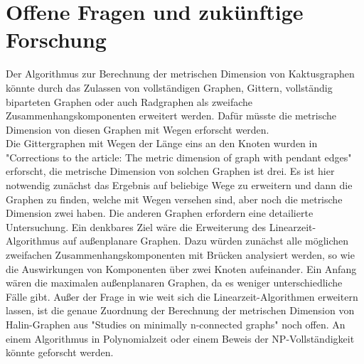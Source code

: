 \section{Offene Fragen und zukünftige Forschung}
\vspace{-2mm}
Der Algorithmus zur Berechnung der metrischen Dimension von Kaktusgraphen könnte durch das Zulassen von vollständigen Graphen, Gittern, vollständig biparteten Graphen oder auch Radgraphen als zweifache Zusammenhangskomponenten erweitert werden. Dafür müsste die metrische Dimension von diesen Graphen mit Wegen erforscht werden.\\ Die Gittergraphen mit Wegen der Länge eins an den Knoten wurden in "Corrections to the article: The metric dimension of graph with pendant edges" \cite{grid} erforscht, die metrische Dimension von solchen Graphen ist drei. Es ist hier notwendig zunächst das Ergebnis auf beliebige Wege zu erweitern und dann die Graphen zu finden, welche mit Wegen versehen sind, aber noch die metrische Dimension zwei haben. Die anderen Graphen erfordern eine detailierte Untersuchung.
\vspace{-1.5mm}\newline\newline
Ein denkbares Ziel wäre die Erweiterung des Linearzeit-Algorithmus auf außenplanare Graphen. Dazu würden zunächst alle möglichen zweifachen Zusammenhangskomponenten mit Brücken analysiert werden, so wie die Auswirkungen von Komponenten über zwei Knoten aufeinander. Ein Anfang wären die maximalen außenplanaren Graphen, da es weniger unterschiedliche Fälle gibt.
\vspace{-1.5mm}\newline\newline
Außer der Frage in wie weit sich die Linearzeit-Algorithmen erweitern lassen, ist die genaue Zuordnung der Berechnung der metrischen Dimension von Halin-Graphen aus "{Studies on minimally n-connected graphs}" \cite{halin} noch offen. An einem Algorithmus in Polynomialzeit oder einem Beweis der NP-Vollständigkeit könnte geforscht werden.


\clearpage


\clearpage
\listoffigures
\listoftables

